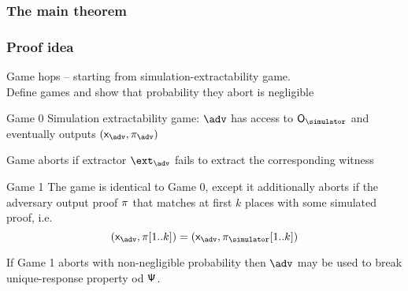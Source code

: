 \documentclass[aspectratio=169]{beamer}
\begin{document}
\begin{frame}
  \frametitle{The main theorem}
\begin{theorem}
  \label{thm:se}
%

\end{theorem}
\end{frame}

\begin{frame}
  \frametitle{Proof idea}
  Game hops -- starting from simulation-extractability game.\\
  Define games and show that probability they abort is negligible\pause

\begin{block}{Game 0}
  Simulation extractability game: $\adv$ has access to $\oracles$ and eventually
  outputs $(\inpa, \zkproofa)$

  Game aborts if extractor $\ext_\adv$ fails to extract the corresponding witness
\end{block}\pause

\begin{block}{Game 1}
  The game is identical to Game 0, except it additionally aborts if the
  adversary output proof $\pi$ that matches at first $k$ places with some
  simulated proof, i.e.
  \[
    (\inpa, \zkproof[1..k]) = (\inpa, \zkproofs[1..k])
  \]

  If Game 1 aborts with non-negligible probability then $\adv$ may be used to
  break unique-response property od ${\mathsf{\Psi}}$.
\end{block}
\end{frame}
\end{document}
